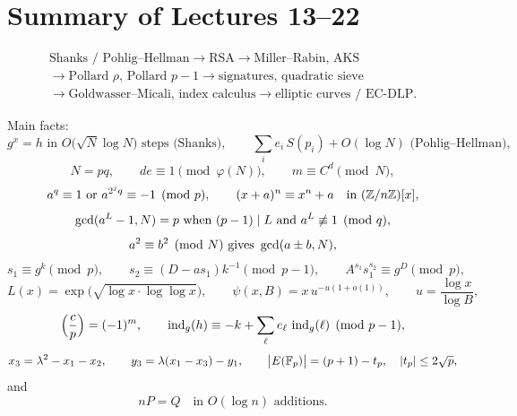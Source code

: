 \clearpage
{}
{}
\section*{Summary of Lectures 13--22}
\vspace{0.4em}

\[
\boxed{
\begin{array}{c}
\text{Shanks / Pohlig--Hellman}
\longrightarrow
\text{RSA}
\longrightarrow
\text{Miller--Rabin, AKS}
\\[4pt]
\longrightarrow
\text{Pollard $\rho$, Pollard $p-1$}
\longrightarrow
\text{signatures, quadratic sieve}
\\[4pt]
\longrightarrow
\text{Goldwasser--Micali, index calculus}
\longrightarrow
\text{elliptic curves / EC-DLP}.
\end{array}
}
\]

Main facts:
\[
    g^{x}=h
    \text{ in }
    O\bigl(\sqrt{N}\log N\bigr)
    \text{ steps (Shanks)},
    \qquad
    \sum_{i}e_{i}\,S(p_{i})+O(\log N)
    \text{ (Pohlig--Hellman)},
\]
\[
    N=pq,
    \qquad
    de\equiv 1\pmod{\varphi(N)},
    \qquad
    m\equiv C^{d}\pmod{N},
\]
\[
    a^{q}\equiv 1
    \text{ or }
    a^{2^{j}q}\equiv -1\pmod{p},
    \qquad
    (x+a)^{n}\equiv x^{n}+a
    \quad\text{in }(\mathbb Z/n\mathbb Z)[x],
\]
\[
    \operatorname{gcd}(a^{L}-1,N)=p
    \text{ when }(p-1)\mid L\text{ and }a^{L}\not\equiv 1\pmod{q},
\]
\[
    a^{2}\equiv b^{2}\pmod{N}
    \text{ gives }
    \operatorname{gcd}(a\pm b,N),
\]
\[
    s_{1}\equiv g^{k}\pmod{p},
    \qquad
    s_{2}\equiv (D-as_{1})k^{-1}\pmod{p-1},
    \qquad
    A^{s_{1}}s_{1}^{s_{2}}\equiv g^{D}\pmod{p},
\]
\[
    L(x)=\exp\bigl(\sqrt{\log x\cdot\log\log x}\bigr),
    \qquad
    \psi(x,B)=x\,u^{-u(1+o(1))},
    \qquad
    u=\frac{\log x}{\log B},
\]
\[
    \Bigl(\frac{c}{p}\Bigr)=(-1)^{m},
    \qquad
    \operatorname{ind}_{g}(h)
    \equiv
    -k+\sum_{\ell}e_{\ell}\,\operatorname{ind}_{g}(\ell)
    \pmod{p-1},
\]
\[
    x_{3}=\lambda^{2}-x_{1}-x_{2},
    \qquad
    y_{3}=\lambda(x_{1}-x_{3})-y_{1},
    \qquad
    \bigl|E(\mathbb F_p)\bigr|=(p+1)-t_{p},
    \quad
    |t_{p}|\le 2\sqrt{p},
\]
and
\[
    nP=Q
    \quad\text{in }O(\log n)\text{ additions}.
\]
